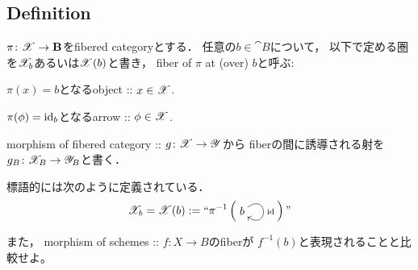 \documentclass[a4paper, dvipdfmx]{jsarticle}
\begin{document}
\subsection{Definition}
\begin{Def}[Fiber]
    $\pi \colon \fibX \to \cat{B}$をfibered categoryとする．
    任意の$b \in \cat{B}$について，
    以下で定める圏を$\fibX_b$あるいは$\fibX(b)$と書き，
    fiber of $\pi$ at (over) $b$と呼ぶ:
    \begin{description}[labelindent=1cm]
        \item[Object.] $\pi(x)=b$となるobject :: $x \in \fibX$.
        \item[Arrow.] $\pi(\phi)=\id[b]$となるarrow :: $\phi \in \fibX$.
    \end{description}

    morphism of fibered category :: $g \colon \fibX \to \fibY$から
    fiberの間に誘導される射を$g_B \colon \fibX_B \to \fibY_B$と書く．
\end{Def}
\begin{Remark}
    標語的には次のように定義されている．
    \[
        \fibX_b=\fibX(b):=``
        \pi^{-1} \left(
        \vcenter{\xymatrix{
            b \ar@(ur,dr)^-{\id}
        }}
        \right)"
    \]
    
    また，
    morphism of schemes :: $f \colon X \to B$のfiberが
    $f^{-1}(b)$と表現されることと比較せよ。
\end{Remark}
\end{document}
